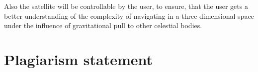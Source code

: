 \documentclass[conference,compsoc]{IEEEtran}
\begin{document}
Also the  satellite will be controllable by the user, to ensure, that the user gets a better understanding of the complexity of navigating in a three-dimensional space under the influence of gravitational pull to other celestial bodies. 


%
%

\section{Plagiarism statement}
\end{document}
